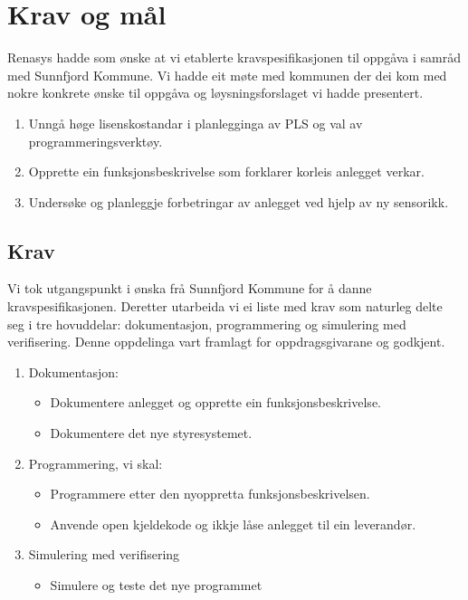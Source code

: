 \chapter{Krav og mål}
\thispagestyle{fancy}
\label{sec: 5}

\gls{Renasys} hadde som ønske at vi etablerte kravspesifikasjonen til oppgåva 
i samråd med \gls{Sunnfjord Kommune}.\newline
Vi hadde eit møte med kommunen der dei kom med nokre konkrete ønske til oppgåva
og løysningsforslaget vi hadde presentert.

\begin{enumerate}
    \item Unngå høge lisenskostandar i planlegginga av PLS og val av programmeringsverktøy.
    \item Opprette ein funksjonsbeskrivelse som forklarer korleis anlegget verkar.
    \item Undersøke og planleggje forbetringar av anlegget ved hjelp av ny sensorikk.
\end{enumerate}

\section{Krav}
Vi tok utgangspunkt i ønska frå \gls{Sunnfjord Kommune} for å danne kravspesifikasjonen.
Deretter utarbeida vi ei liste med krav som naturleg delte seg i tre
hovuddelar: dokumentasjon, programmering og simulering med verifisering. 
Denne oppdelinga vart framlagt for oppdragsgivarane og godkjent. 

\begin{enumerate}
    \item Dokumentasjon:
    \begin{itemize}
        \item Dokumentere anlegget og opprette ein funksjonsbeskrivelse.
        \item Dokumentere det nye styresystemet.
    \end{itemize}
    \item Programmering, vi skal:
    \begin{itemize}
        \item Programmere etter den nyoppretta funksjonsbeskrivelsen.
        \item Anvende open kjeldekode og ikkje låse anlegget til ein leverandør.
    \end{itemize}
    \item Simulering med verifisering
    \begin{itemize}
        \item Simulere og teste det nye programmet
    \end{itemize}
\end{enumerate}


